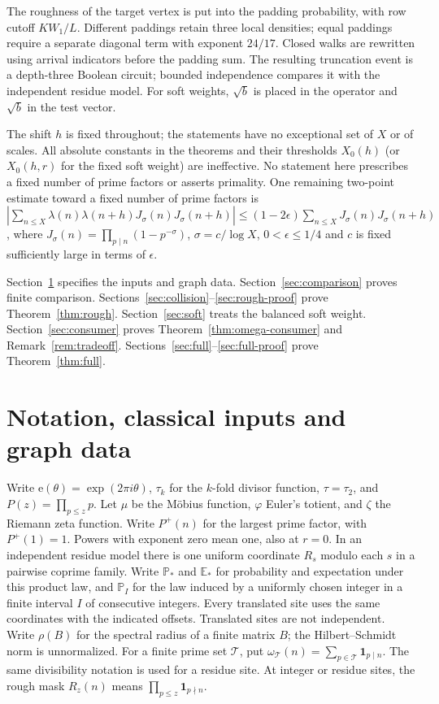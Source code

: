 \documentclass[11pt]{article}
\theoremstyle{definition}
\newcommand{\e}{\mathrm e}
\newcommand{\E}{\mathbb E}
\newcommand{\Prob}{\mathbb P}
\newcommand{\ind}{\mathbf 1}
\theoremstyle{remark}
\numberwithin{equation}{section}
\begin{document}
The roughness of the target vertex is put into the padding probability, with row cutoff $KW_1/L$.
Different paddings retain three local densities; equal paddings require a separate diagonal term with exponent
$24/17$. Closed walks are rewritten using arrival indicators before the padding sum. The resulting truncation
event is a depth-three Boolean circuit; bounded independence compares it with the independent residue model.
For soft weights, $\sqrt b$ is placed in the operator and $\sqrt b$ in the test vector.

The shift $h$ is fixed throughout; the statements have no exceptional set of $X$ or of scales.
All absolute constants in the theorems and their thresholds $X_0(h)$
(or $X_0(h,r)$ for the fixed soft weight) are ineffective. No statement here prescribes a fixed number of prime factors
or asserts primality. One remaining two-point estimate toward a fixed number of prime factors is
$|\sum_{n\le X}\lambda(n)\lambda(n+h)J_\sigma(n)J_\sigma(n+h)|\le
(1-2\epsilon)\sum_{n\le X}J_\sigma(n)J_\sigma(n+h)$,
where $J_\sigma(n)=\prod_{p\mid n}(1-p^{-\sigma})$, $\sigma=c/\log X$, $0<\epsilon\le1/4$ and $c$ is fixed
sufficiently large in terms of $\epsilon$.

Section~\ref{sec:setup} specifies the inputs and graph data. Section~\ref{sec:comparison} proves finite comparison.
Sections~\ref{sec:collision}--\ref{sec:rough-proof} prove Theorem~\ref{thm:rough}.
Section~\ref{sec:soft} treats the balanced soft weight. Section~\ref{sec:consumer} proves
Theorem~\ref{thm:omega-consumer} and Remark~\ref{rem:tradeoff}.
Sections~\ref{sec:full}--\ref{sec:full-proof} prove Theorem~\ref{thm:full}.

\section{Notation, classical inputs and graph data}\label{sec:setup}
Write $\e(\theta)=\exp(2\pi i\theta)$, $\tau_k$ for the $k$-fold divisor function, $\tau=\tau_2$,
and $P(z)=\prod_{p\le z}p$. Let $\mu$ be the M\"obius function, $\varphi$ Euler's totient, and $\zeta$ the Riemann zeta function.
Write $P^+(n)$ for the largest prime factor, with $P^+(1)=1$. Powers with exponent zero mean one, also at $r=0$.
In an independent residue model there is one uniform coordinate $R_s$ modulo each $s$ in a pairwise coprime family.
Write $\Prob_*$ and $\E_*$ for probability and expectation under this product law, and $\Prob_I$ for the law induced
by a uniformly chosen integer in a finite interval $I$ of consecutive integers. Every translated site uses the same
coordinates with the indicated offsets. Translated sites are not independent.
Write $\rho(B)$ for the spectral radius of a finite matrix $B$; the Hilbert--Schmidt norm is unnormalized.
For a finite prime set $\mathcal T$, put $\omega_{\mathcal T}(n)=\sum_{p\in\mathcal T}\ind_{p\mid n}$.
The same divisibility notation is used for a residue site. At integer or residue sites, the rough mask
$R_z(n)$ means $\prod_{p\le z}\ind_{p\nmid n}$.
\end{document}
